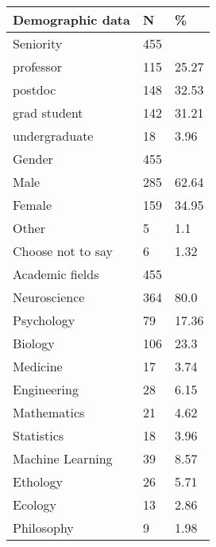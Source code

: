 \begin{tabular}{p{12cm} p{2cm} p{2cm}}
 Demographic data & N & \% \\ 
\hline
Seniority & 455 & \\ 
\hspace{5mm} professor & 115 & 25.27\\ 
\hspace{5mm} postdoc & 148 & 32.53\\ 
\hspace{5mm} grad student & 142 & 31.21\\ 
\hspace{5mm} undergraduate & 18 & 3.96\\ 
Gender & 455 & \\ 
\hspace{5mm} Male & 285 & 62.64\\ 
\hspace{5mm} Female & 159 & 34.95\\ 
\hspace{5mm} Other & 5 & 1.1\\ 
\hspace{5mm} Choose not to say & 6 & 1.32\\ 
Academic fields & 455 & \\ 
\hspace{5mm} Neuroscience & 364 & 80.0\\ 
\hspace{5mm} Psychology & 79 & 17.36\\ 
\hspace{5mm} Biology & 106 & 23.3\\ 
\hspace{5mm} Medicine & 17 & 3.74\\ 
\hspace{5mm} Engineering & 28 & 6.15\\ 
\hspace{5mm} Mathematics & 21 & 4.62\\ 
\hspace{5mm} Statistics & 18 & 3.96\\ 
\hspace{5mm} Machine Learning & 39 & 8.57\\ 
\hspace{5mm} Ethology & 26 & 5.71\\ 
\hspace{5mm} Ecology & 13 & 2.86\\ 
\hspace{5mm} Philosophy & 9 & 1.98\\ 

\end{tabular}
